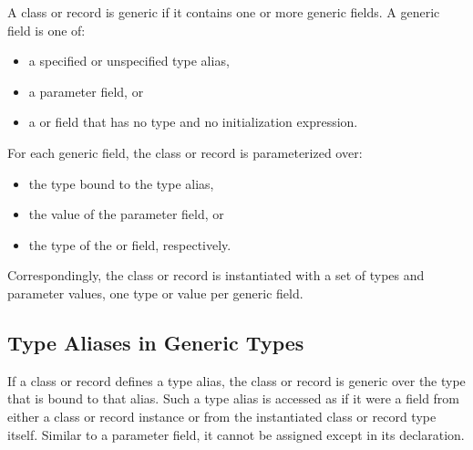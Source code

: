 A class or record is generic if it contains one or more
generic fields. A generic field is one of:
\begin{itemize}
\item a specified or unspecified type alias,
\item a parameter field, or
\item a  or  field that has no type and no initialization
expression.
\end{itemize}

For each generic field, the class or record is parameterized over:
\begin{itemize}
\item the type bound to the type alias,
\item the value of the parameter field, or
\item the type of the  or  field, respectively.
\end{itemize}
Correspondingly, the class or record is instantiated with a set
of types and parameter values, one type or value per generic field.

%
%

\subsection{Type Aliases in Generic Types}
\label{Type_Aliases_in_Generic_Types}

If a class or record defines a type alias, the class or record
is generic over the type that is bound to that alias.
Such a type alias is accessed as if it were a field from either a class
or record instance or from the instantiated class or record type itself.
Similar to a parameter field, it cannot be assigned
except in its declaration.

